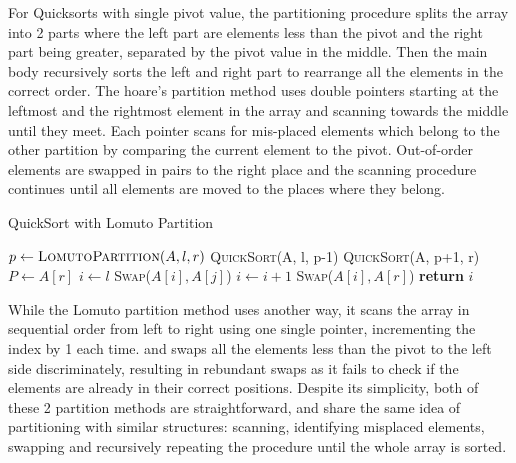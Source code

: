 \documentclass{article}
\begin{document}
For Quicksorts with single pivot value, the partitioning procedure splits the array into 2 parts where the left part are elements less than the pivot and the right part being greater, 
separated by the pivot value in the middle. Then the main body recursively sorts the left and right part to rearrange all the elements in the correct order. The hoare's partition method
uses double pointers starting at the leftmost and the rightmost element in the array and scanning towards the middle until they meet. Each pointer scans for mis-placed elements 
which belong to the other partition by comparing the current element to the pivot. 
Out-of-order elements are swapped in pairs to the right place and the scanning procedure continues until all elements 
are moved to the places where they belong.

\begin{algorithm}[H]
    \caption{QuickSort with Lomuto Partition}\label{LomutoPartition}
    \begin{algorithmic}[1]
        \State $p \gets \textsc{LomutoPartition}(A, l, r)$
        \State \textsc{QuickSort}(A, l, p-1)
        \State \textsc{QuickSort}(A, p+1, r)
        \EndIf
        \EndProcedure
        \State $P \gets A[r]$ 
        \State $i \gets l$
        \State \textsc{Swap}($A[i], A[j]$)
        \State $i \gets i + 1$
        \EndIf
        \EndFor
        \State \textsc{Swap}($A[i], A[r]$) 
        \State \textbf{return} $i$
        \EndProcedure
    \end{algorithmic}
\end{algorithm}

While the Lomuto partition method uses another way, it scans the array in sequential order from left to right using one single pointer, incrementing the index by 1 each time.
and swaps all the elements less than the pivot to the left side discriminately,
resulting in rebundant swaps as it fails to check if the elements are already in their correct positions. Despite its simplicity, both of these 2 partition methods are straightforward, 
and share the same idea of partitioning with similar structures: scanning, identifying misplaced elements, swapping and recursively repeating the procedure until the whole array is sorted.
\end{document}
